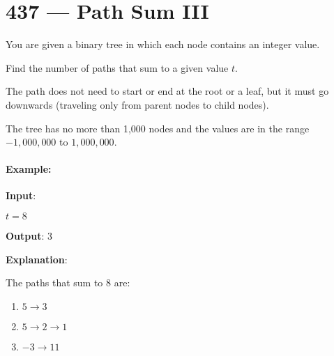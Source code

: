 \section{437 --- Path Sum III}
You are given a binary tree in which each node contains an integer value.

Find the number of paths that sum to a given value $t$.

The path does not need to start or end at the root or a leaf, but it must go downwards (traveling only from parent nodes to child nodes).

The tree has no more than 1,000 nodes and the values are in the range $-1,000,000$ to $1,000,000$.

\paragraph{Example:}
\begin{flushleft}
\textbf{Input}:
\begin{figure}[H]
\end{figure}

$t = 8$

\textbf{Output}: 3


\textbf{Explanation}:

The paths that sum to 8 are:

\begin{enumerate}
\item $5 \longrightarrow 3$
\item $5 \longrightarrow 2 \longrightarrow 1$
\item $-3 \longrightarrow 11$
\end{enumerate}

\end{flushleft}

